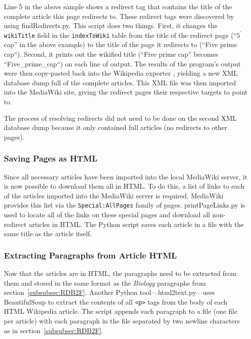 Line 5 in the above sample shows a redirect tag that contains the title of the complete article this page redirects to.
These redirect tags were discovered by using findRedirects.py.
This script does two things.
First, it changes the {\tt wikiTitle} field in the {\tt indexToWiki} table from the title of the redirect page (``$5^\prime$ cap'' in the above example) to the title of the page it redirects to (``Five prime cap``).
Second, it prints out the wikified title (``Five prime cap'' becomes ``Five\_prime\_cap``) on each line of output.
The results of the program's output were then copy-pasted back into the Wikipedia exporter \cite{wiki-exporter}, yielding a new XML database dump full of the complete articles.
This XML file was then imported into the MediaWiki site, giving the redirect pages their respective targets to point to.

The process of resolving redirects did not need to be done on the second XML database dump because it only contained full articles (no redirects to other pages).

\subsubsection{Saving Pages as HTML}
\label{sec:html-pages}

Since all necessary articles have been imported into the local MediaWiki server, it is now possible to download them all in HTML.
To do this, a list of links to each of the articles imported into the MediaWiki server is required.
MediaWiki provides this list via the {\tt Special:AllPages} family of pages.
printPageLinks.py is used to locate all of the links on these special pages and download all non-redirect articles in HTML.
The Python script saves each article in a file with the same title as the article itself.

\subsubsection{Extracting Paragraphs from Article HTML}
\label{sec:training-files}

Now that the articles are in HTML, the paragraphs need to be extracted from them and stored in the same format as the {\it Biology} paragraphs from section~\ref{subsubsec:RDB2F}.
Another Python tool---html2text.py---uses BeautifulSoup \cite{beautifulsoup} to extract the contents of all {\tt <p>} tags from the body of each HTML Wikipedia article.
The script appends each paragraph to a file (one file per article) with each paragraph in the file separated by two newline characters as in section~\ref{subsubsec:RDB2F}.

